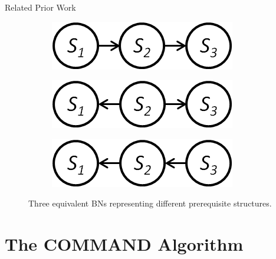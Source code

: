 \documentclass[hyperref={pdfpagelabels=false}]{beamer}
\begin{document}
\begin{frame}{Related Prior Work}
	\begin{figure}[!ht]\small
		\centering
		\begin{subfigure}[t]{0.3\linewidth}
			\centering
			\includegraphics[width=0.9\linewidth]{figures/s1s2s3.png}
			\caption{\label{fig:equivnet1}}
		\end{subfigure}
		\begin{subfigure}[t]{0.3\linewidth}
			\centering
			\includegraphics[width=0.9\linewidth]{figures/s2s1s3.png}
			\caption{\label{fig:equivnet2}}
		\end{subfigure}
		\begin{subfigure}[t]{0.3\linewidth}
			\centering
			\includegraphics[width=0.9\linewidth]{figures/s3s2s1.png}
			\caption{\label{fig:equivnet3}}			
		\end{subfigure}		
		\caption{Three equivalent BNs representing different prerequisite structures.\label{fig:equivnets} }
	\end{figure}	
\end{frame}

\section{The COMMAND Algorithm}
\end{document}
